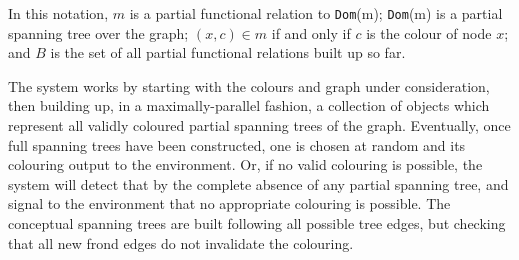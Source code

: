 \begin{algorithm}
\DontPrintSemicolon
{}

\hrulefill

\caption[Pseudocode representation of the algorithm performed by the \glspl{cps} rules in \cref{ruleset:gcol:rules}]{\label{code:gcol:graphcol}Pseudocode representation of the algorithm performed by the \glspl{cps} rules in \cref{ruleset:gcol:rules}.  This employs a doubly defined tail-recursive function approach, where the algorithm begins with the upper function supplied only with the details of the graph and colours, but uses the lower function with further arguments to perform most of the processing.}
\end{algorithm}

In this notation, \(m\) is a partial functional relation to \texttt{Dom}(m); \texttt{Dom}(m) is a partial spanning tree over the graph; \((x, c) \in m\) if and only if \(c\) is the colour of node \(x\);  and \(B\) is the set of all partial functional relations built up so far.

The system works by starting with the colours and graph under consideration, then building up, in a maximally-parallel fashion, a collection of objects which represent all validly coloured partial spanning trees of the graph.  Eventually, once full spanning trees have been constructed, one is chosen at random and its colouring output to the environment.  Or, if no valid colouring is possible, the system will detect that by the complete absence of any partial spanning tree, and signal to the environment that no appropriate colouring is possible.  The conceptual spanning trees are built following all possible tree edges, but checking that all new frond edges do not invalidate the colouring.

